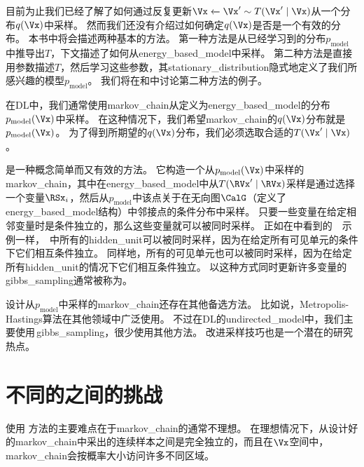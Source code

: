 目前为止我们已经了解了如何通过反复更新$\Vx \xleftarrow{} \Vx'\sim T(\Vx'\mid\Vx)$从一个分布$q(\Vx)$中采样。 
然而我们还没有介绍过如何确定$q(\Vx)$是否是一个有效的分布。
本书中将会描述两种基本的方法。  
第一种方法是从已经学习到的分布$p_{\text{model}}$中推导出$T$，下文描述了如何从\gls{energy_based_model}中采样。
第二种方法是直接用参数描述$T$，然后学习这些参数，其\gls{stationary_distribution}隐式地定义了我们所感兴趣的模型$p_{\text{model}}$。
我们将在和中讨论第二种方法的例子。  


在\gls{DL}中，我们通常使用\gls{markov_chain}从定义为\gls{energy_based_model}的分布$p_{\text{model}}(\Vx)$中采样。
在这种情况下，我们希望\gls{markov_chain}的$q(\Vx)$分布就是$p_{\text{model}}(\Vx)$。
为了得到所期望的$q(\Vx)$分布，我们必须选取合适的$T(\Vx'\mid \Vx)$。


是一种概念简单而又有效的方法。
它构造一个从$p_{\text{model}}(\Vx)$中采样的\gls{markov_chain}，其中在\gls{energy_based_model}中从$T(\RVx'\mid \RVx)$采样是通过选择一个变量$\RSx_i$，然后从$p_{\text{model}}$中该点关于在无向图$\CalG$（定义了\gls{energy_based_model}结构）中邻接点的条件分布中采样。
只要一些变量在给定相邻变量时是条件独立的，那么这些变量就可以被同时采样。
正如在中看到的~~示例一样，~中所有的\gls{hidden_unit}可以被同时采样，因为在给定所有可见单元的条件下它们相互条件独立。
同样地，所有的可见单元也可以被同时采样，因为在给定所有\gls{hidden_unit}的情况下它们相互条件独立。 
以这种方式同时更新许多变量的\,\gls{gibbs_sampling}通常被称为。   

设计从$p_{\text{model}}$中采样的\gls{markov_chain}还存在其他备选方法。  
比如说，Metropolis-Hastings算法在其他领域中广泛使用。
不过在\gls{DL}的\gls{undirected_model}中，我们主要使用\,\gls{gibbs_sampling}，很少使用其他方法。 
改进采样技巧也是一个潜在的研究热点。


\section{不同的之间的挑战}
\label{sec:the_challenge_of_mixing_between_separated_modes}

使用\,\,方法的主要难点在于\gls{markov_chain}的通常不理想。
在理想情况下，从设计好的\gls{markov_chain}中采出的连续样本之间是完全独立的，而且在$\Vx$空间中，\gls{markov_chain}会按概率大小访问许多不同区域。


